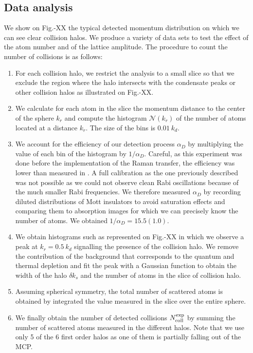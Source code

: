 \subsection{Data analysis}

We show on Fig.-XX the typical detected momentum distribution on which we can see clear collision halos. We produce a variety of data sets to test the effect of the atom number and of the lattice amplitude. The procedure to count the number of collisions is as follows:

\begin{enumerate}
    \item For each collision halo, we restrict the analysis to a small slice so that we exclude the region where the halo intersects with the condensate peaks or other collision halos as illustrated on Fig.-XX. 
    \item We calculate for each atom in the slice the momentum distance to the center of the sphere $k_r$ and compute the histogram $\mathcal{N}(k_r)$ of the number of atoms located at a distance $k_r$. The size of the bins is $0.01 \ k_d$.
    \item We account for the efficiency of our detection process $\alpha_D$ by multiplying the value of each bin of the histogram by $1/\alpha_D$. Careful, as this experiment was done before the implementation of the Raman transfer, the efficiency was lower than measured in . A full calibration as the one previously described was not possible as we could not observe clean Rabi oscillations because of the much smaller Rabi frequencies. We therefore measured $\alpha_D$ by recording diluted distributions of Mott insulators to avoid saturation effects and comparing them to absorption images for which we can precisely know the number of atoms. We obtained $1/\alpha_D=15.5(1.0)$.
    \item We obtain histograms such as represented on Fig.-XX in which we observe a peak at $k_r=0.5 \ k_d$ signalling the presence of the collision halo. We remove the contribution of the background that corresponds to the quantum and thermal depletion and fit the peak with a Gaussian function to obtain the width of the halo $\delta k_s$ and the number of atoms in the slice of collision halo.
    \item Assuming spherical symmetry, the total number of scattered atoms is obtained by integrated the value measured in the slice over the entire sphere. 
    \item We finally obtain the number of detected collisions $N_{\rm{coll}}^{\rm{exp}}$ by summing the number of scattered atoms measured in the different halos. Note that we use only 5 of the 6 first order halos as one of them is partially falling out of the MCP.
\end{enumerate}

